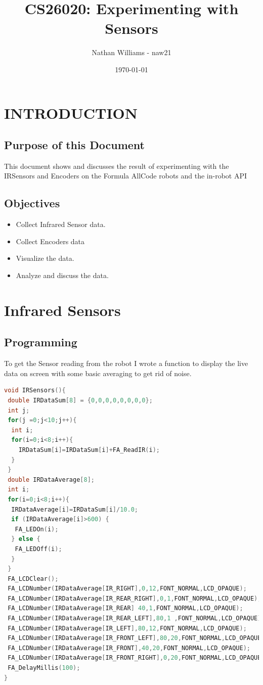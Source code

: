 \documentclass[11pt,a4paper,titlepage]{article}
\title{CS26020: Experimenting with Sensors}
\author{Nathan Williams - naw21}
\date{\today}
\begin{document}
\maketitle
\tableofcontents
\listoffigures
\newpage
\section{INTRODUCTION}

\subsection{Purpose of this Document}

This document shows and discusses the result of experimenting with the IRSensors and Encoders on the Formula AllCode robots\cite{Formula all-code} and the in-robot API\cite{in-robot api}

\subsection{Objectives}
	
\begin{itemize}
	\item Collect Infrared Sensor data.
	\item Collect Encoders data
	\item Visualize the data.
	\item Analyze and discuss the data.
\end{itemize}

\section{Infrared Sensors}
\subsection{Programming}
To get the Sensor reading from the robot I wrote a function to display the live data on screen with some basic averaging to get rid of noise.
\begin{lstlisting}[language=C,frame=single]
void IRSensors(){
 double IRDataSum[8] = {0,0,0,0,0,0,0,0};
 int j;
 for(j =0;j<10;j++){
  int i;
  for(i=0;i<8;i++){
	IRDataSum[i]=IRDataSum[i]+FA_ReadIR(i);	
  }
 }
 double IRDataAverage[8];
 int i;
 for(i=0;i<8;i++){
  IRDataAverage[i]=IRDataSum[i]/10.0;
  if (IRDataAverage[i]>600) {
   FA_LEDOn(i);
  } else {
   FA_LEDOff(i);
  }
 }
 FA_LCDClear();
 FA_LCDNumber(IRDataAverage[IR_RIGHT],0,12,FONT_NORMAL,LCD_OPAQUE);
 FA_LCDNumber(IRDataAverage[IR_REAR_RIGHT],0,1,FONT_NORMAL,LCD_OPAQUE);
 FA_LCDNumber(IRDataAverage[IR_REAR] 40,1,FONT_NORMAL,LCD_OPAQUE);
 FA_LCDNumber(IRDataAverage[IR_REAR_LEFT],80,1 ,FONT_NORMAL,LCD_OPAQUE);
 FA_LCDNumber(IRDataAverage[IR_LEFT],80,12,FONT_NORMAL,LCD_OPAQUE);
 FA_LCDNumber(IRDataAverage[IR_FRONT_LEFT],80,20,FONT_NORMAL,LCD_OPAQUE);
 FA_LCDNumber(IRDataAverage[IR_FRONT],40,20,FONT_NORMAL,LCD_OPAQUE);
 FA_LCDNumber(IRDataAverage[IR_FRONT_RIGHT],0,20,FONT_NORMAL,LCD_OPAQUE);
 FA_DelayMillis(100);
}

\end{lstlisting}
\end{document}

